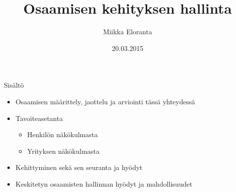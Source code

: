 \documentclass[first=purple,second=dblue,logo=redquo]{aaltoslides}
\title{Osaamisen kehityksen hallinta}
\author[M. Eloranta]{Miikka Eloranta}
\institute[AS]{Automaatio- ja systeemitekniikka\\
Sähkötekniikan korkeakoulu, Aalto-yliopisto}
\date{20.03.2015}
\begin{document}
\aaltotitleframe

\begin{frame}{Sisältö}
\begin{itemize}
\item Osaamisen määrittely, jaottelu ja arviointi tässä yhteydessä
\item Tavoiteasetanta
\begin{itemize}
\item Henkilön näkökulmasta
\item Yrityksen näkökulmasta
\end{itemize}
\item Kehittyminen sekä sen seuranta ja hyödyt
\item Keskitetyn osaamisten hallinnan hyödyt ja mahdollisuudet
\end{itemize}

\end{frame}
\end{document}
